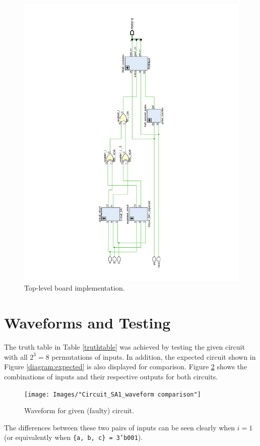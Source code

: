 \documentclass{article}
\renewcommand{\c}[1]{\texttt{#1}}
\begin{document}
\begin{figure}[H]
    \centering
    \includegraphics[height=\textwidth, angle=-90]{Images/schematic_toplevel}
    \caption{Top-level board implementation.}
    \label{diagram:top-level}
\end{figure}

\section{Waveforms and Testing} The truth table in
Table \ref{truthtable} was achieved by testing the given
circuit with all \(2^3 = 8\) permutations of inputs.
In addition, the expected circuit shown in Figure
\ref{diagram:expected} is also displayed for comparison.
Figure \ref{waveform:comparison} shows the combinations
of inputs and their respective outputs for both circuits.

\begin{figure}[H]
    \centering
    \texttt{[image: Images/"Circuit\_SA1\_waveform comparison"]}
    \caption{Waveform for given (faulty) circuit.}
    \label{waveform:comparison}
\end{figure}

The differences between these two pairs of inputs can be seen
clearly when \(i = 1\) (or equivalently when
\c{\{a, b, c\} = 3'b001}).
\end{document}
